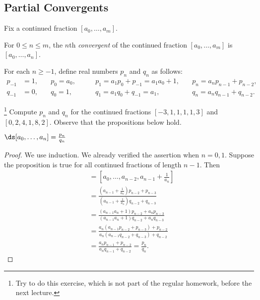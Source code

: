 \documentclass[11pt]{report}
\begin{document}
\subsection{Partial Convergents}
Fix a continued fraction $[a_0,\ldots,a_m]$.
\begin{definition}
  For $0\leq n\leq m$, the $n$th {\em convergent} of the
  continued fraction $[a_0,\ldots,a_m]$
  is $[a_0,\ldots, a_n]$.
\end{definition}
For each $n\geq -1$, define real numbers $p_n$ and $q_n$ as follows:
\begin{align*}
  p_{-1} & = 1, \quad                   & p_0 = a_0, \qquad & p_1 = a_1 p_0 + p_{-1} = a_1 a_0 + 1,
  \quad  & p_n = a_n p_{n-1} + p_{n-2},                                                             \\
  q_{-1} & = 0, \quad                   & q_0 = 1, \qquad   & q_1 = a_1 q_0 + q_{-1} = a_1,
  \quad  & q_n = a_n q_{n-1} + q_{n-2}.
\end{align*}

\begin{exercise}\footnote{Try to do this exercise, which
    is not part of the regular homework, before the next lecture.}
  Compute $p_n$ and $q_n$ for the continued fractions
  $[-3,1,1,1,1,3]$ and $[0,2,4,1,8,2]$.  Observe that the
  propositions below hold.
\end{exercise}


\begin{proposition}
  $\ds [a_0, \ldots, a_n] = \frac{p_n}{q_n}$
\end{proposition}
\begin{proof}
  We use induction.  We already verified the assertion when $n=0,1$.
  Suppose the proposition is true for all continued fractions of
  length $n-1$.  Then
  \begin{align*}
    [a_0,\ldots, a_n]
     & = [a_0,\ldots,a_{n-2}, a_{n-1} + \frac{1}{a_n}]                          \\
     & = \frac{\left( a_{n-1} + \frac{1}{a_n}\right) p_{n-2} + p_{n-3}}
    {\left( a_{n-1} + \frac{1}{a_n}\right) q_{n-2} + q_{n-3}}                   \\
     & = \frac{(a_{n-1}a_n +1)p_{n-2} + a_n p_{n-3}}
    {(a_{n-1}a_n +1)q_{n-2} + a_n q_{n-3}}                                      \\
     & = \frac{a_n(a_{n-1}p_{n-2} + p_{n-3}) + p_{n-2}}
    {a_n(a_{n-1}q_{n-2} + q_{n-3}) + q_{n-2}}                                   \\
     & = \frac{a_n p_{n-1} + p_{n-2}}{a_n q_{n-1} + q_{n-2}} = \frac{p_n}{q_n}.
  \end{align*}
\end{proof}
\end{document}
